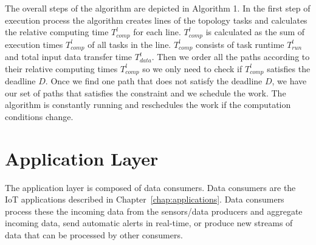 The overall steps of the algorithm are depicted in Algorithm 1. In the first step of execution process the algorithm creates lines of the topology tasks and calculates the relative computing time $T_{comp}^l$ for each line. $T_{comp}^l$ is calculated as the sum of execution times $T_{comp}^l$ of all tasks in the line. $T_{comp}^l$ consists of task runtime $T_{run}^t$ and total input data transfer time $T_{data}^t$. Then we order all the paths according to their relative computing times $T_{comp}^l$ so we only need to check if $T_{comp}^l$ satisfies the deadline $D$. Once we find one path that does not satisfy the deadline $D$, we have our set of paths that satisfies the constraint and we schedule the work. The algorithm is constantly running and reschedules the work if the computation conditions change.

\section{Application Layer}

The application layer is composed of data consumers. Data consumers are the IoT applications described in Chapter~\ref{chap:applications}. Data consumers process these the incoming data from the sensors/data producers and aggregate incoming data, send automatic alerts in real-time, or produce new streams of data that can be processed by other consumers.